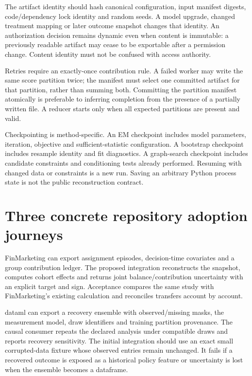 The artifact identity should hash canonical configuration, input manifest
digests, code/dependency lock identity and random seeds. A model upgrade,
changed treatment mapping or later outcome snapshot changes that identity.
An authorization decision remains dynamic even when content is immutable:
a previously readable artifact may cease to be exportable after a permission
change. Content identity must not be confused with access authority.

Retries require an exactly-once contribution rule. A failed worker may
write the same score partition twice; the manifest must select one committed
artifact for that partition, rather than summing both. Committing the
partition manifest atomically is preferable to inferring completion from
the presence of a partially written file. A reducer starts only when all
expected partitions are present and valid.

Checkpointing is method-specific. An EM checkpoint includes model
parameters, iteration, objective and sufficient-statistic configuration.
A bootstrap checkpoint includes resample identity and fit diagnostics.
A graph-search checkpoint includes candidate constraints and conditioning
tests already performed. Resuming with changed data or constraints is a
new run. Saving an arbitrary Python process state is not the public
reconstruction contract.

\section{Three concrete repository adoption journeys}
FinMarketing can export assignment episodes, decision-time covariates and
a group contribution ledger. The proposed integration reconstructs the
snapshot, computes cohort effects and returns joint balance/contribution
uncertainty with an explicit target and sign. Acceptance compares the same
study with FinMarketing's existing calculation and reconciles transfers
account by account.

dataml can export a recovery ensemble with observed/missing masks, the
measurement model, draw identifiers and training partition provenance.
The causal consumer repeats the declared analysis under compatible draws
and reports recovery sensitivity. The initial integration should use an
exact small corrupted-data fixture whose observed entries remain unchanged.
It fails if a recovered outcome is exposed as a historical policy feature
or uncertainty is lost when the ensemble becomes a dataframe.

